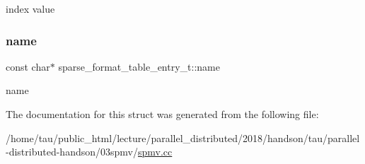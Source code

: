index value \mbox{\label{structsparse__format__table__entry__t_aff9c31fa7933890b2d4cf0f963df2d89}} 
\subsubsection{\texorpdfstring{name}{name}}
{\footnotesize\ttfamily const char$\ast$ sparse\+\_\+format\+\_\+table\+\_\+entry\+\_\+t\+::name}

name 

The documentation for this struct was generated from the following file\+:\begin{DoxyCompactItemize}
\item 
/home/tau/public\+\_\+html/lecture/parallel\+\_\+distributed/2018/handson/tau/parallel-\/distributed-\/handson/03spmv/\hyperlink{spmv_8cc}{spmv.\+cc}\end{DoxyCompactItemize}
